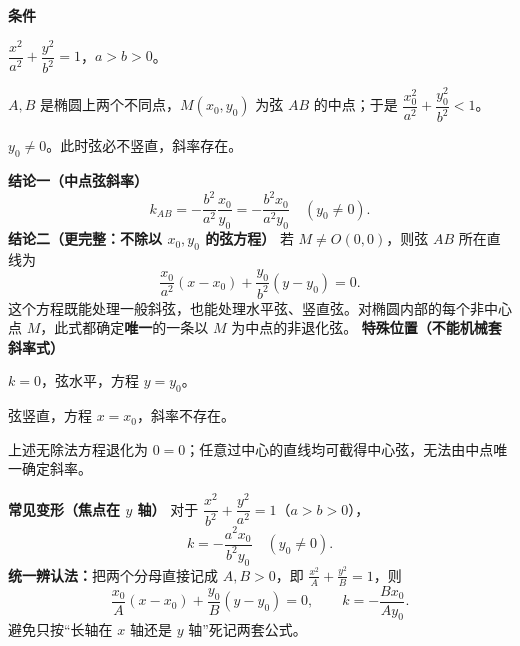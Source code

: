\begin{center}\end{center}
\begin{statementbox}
\textbf{\textcolor{CStatement}{条件}}
\begin{description}[style=nextline,leftmargin=2.8em,labelsep=0.5em,itemsep=0.35em]
  \item[\textbf{条件 1（椭圆）：}] $\dfrac{x^2}{a^2}+\dfrac{y^2}{b^2}=1$，$a>b>0$。
  \item[\textbf{条件 2（真实弦）：}] $A,B$ 是椭圆上两个不同点，$M(x_0,y_0)$ 为弦 $AB$ 的中点；于是 $\dfrac{x_0^2}{a^2}+\dfrac{y_0^2}{b^2}<1$。
  \item[\textbf{条件 3（求斜率时）：}] $y_0\ne0$。此时弦必不竖直，斜率存在。
\end{description}
\medskip
\textbf{\textcolor{CStatement}{结论一（中点弦斜率）}}
\[
\boxed{\quad k_{AB}=-\frac{b^2}{a^2}\frac{x_0}{y_0}
             =-\frac{b^2x_0}{a^2y_0}\quad(y_0\ne0).\quad}
\]
\textbf{\textcolor{CStatement}{结论二（更完整：不除以 $x_0,y_0$ 的弦方程）}}
若 $M\ne O(0,0)$，则弦 $AB$ 所在直线为
\[
\boxed{\quad\frac{x_0}{a^2}(x-x_0)+\frac{y_0}{b^2}(y-y_0)=0.\quad}
\]
这个方程既能处理一般斜弦，也能处理水平弦、竖直弦。对椭圆内部的每个非中心点 $M$，此式都确定\textbf{唯一}的一条以 $M$ 为中点的非退化弦。
\medskip
\textbf{\textcolor{CStatement}{特殊位置（不能机械套斜率式）}}
\begin{description}[style=nextline,leftmargin=2.8em,labelsep=0.5em,itemsep=0.3em]
\item[\textbf{$x_0=0,\ y_0\ne0$：}] $k=0$，弦水平，方程 $y=y_0$。
\item[\textbf{$y_0=0,\ x_0\ne0$：}] 弦竖直，方程 $x=x_0$，斜率不存在。
\item[\textbf{$M=O$：}] 上述无除法方程退化为 $0=0$；任意过中心的直线均可截得中心弦，无法由中点唯一确定斜率。
\end{description}
\medskip
\textbf{\textcolor{CStatement}{常见变形（焦点在 $y$ 轴）}}
对于 $\dfrac{x^2}{b^2}+\dfrac{y^2}{a^2}=1$（$a>b>0$），
\[
\boxed{\quad k=-\frac{a^2x_0}{b^2y_0}\quad(y_0\ne0).\quad}
\]
\textbf{统一辨认法：}把两个分母直接记成 $A,B>0$，即 $\frac{x^2}{A}+\frac{y^2}{B}=1$，则
\[
\boxed{\quad\frac{x_0}{A}(x-x_0)+\frac{y_0}{B}(y-y_0)=0,
\qquad k=-\frac{Bx_0}{Ay_0}.\quad}
\]
避免只按“长轴在 $x$ 轴还是 $y$ 轴”死记两套公式。
\end{statementbox}
